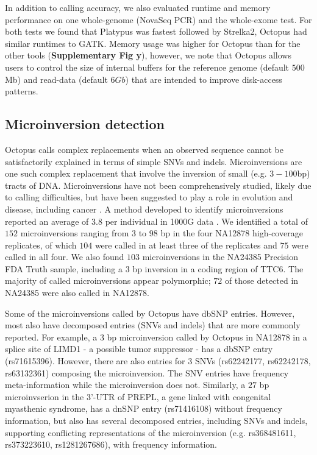 \documentclass[notitlepage, twocolumn, 10pt]{article}
\begin{document}
In addition to calling accuracy, we also evaluated runtime and memory performance on one whole-genome (NovaSeq PCR) and the whole-exome test. For both tests we found that Platypus was fastest followed by Strelka2, Octopus had similar runtimes to GATK. Memory usage was higher for Octopus than for the other tools (\textbf{Supplementary Fig y}), however, we note that Octopus allows users to control the size of internal buffers for the reference genome (default $500$Mb) and read-data (default $6Gb$) that are intended to improve disk-access patterns.

\subsection*{Microinversion detection}

Octopus calls complex replacements when an observed sequence cannot be satisfactorily explained in terms of simple SNVs and indels. Microinversions are one such complex replacement that involve the inversion of small (e.g. $3-100$bp) tracts of DNA. Microinversions have not been comprehensively studied, likely due to calling difficulties, but have been suggested to play a role in evolution \cite{RN561} and disease, including cancer \cite {RN560}. A method developed to identify microinversions reported an average of $3.8$ per individual in 1000G data \cite{RN560}. We identified a total of $152$ microinversions ranging from $3$ to $98$ bp in the four NA12878 high-coverage replicates, of which $104$ were called in at least three of the replicates and $75$ were called in all four. We also found $103$ microinversions in the NA24385 Precision FDA Truth sample, including a $3$ bp inversion in a coding region of TTC6. The majority of called microinversions appear polymorphic; $72$ of those detected in NA24385 were also called in NA12878.

Some of the microinversions called by Octopus have dbSNP entries. However, most also have decomposed entries (SNVs and indels) that are more commonly reported. For example, a $3$ bp microinversion called by Octopus in NA12878 in a splice site of LIMD1 - a possible tumor suppressor - has a dbSNP entry (rs71615396). However, there are also entries for $3$ SNVs (rs62242177, rs62242178, rs63132361) composing the microinversion. The SNV entries have frequency meta-information while the microinversion does not. Similarly, a $27$ bp microinvserion in the 3'-UTR of PREPL, a gene linked with congenital myasthenic syndrome, has a dnSNP entry (rs71416108) without frequency information, but also has several decomposed entries, including SNVs and indels, supporting conflicting representations of the microinversion (e.g. rs368481611, rs373223610, rs1281267686), with frequency information.
\end{document}
